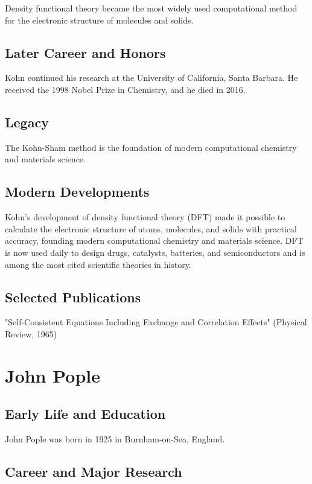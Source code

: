 Density functional theory became the most widely used computational method for the electronic structure of molecules and solids.

\subsection*{Later Career and Honors}

Kohn continued his research at the University of California, Santa Barbara. He received the 1998 Nobel Prize in Chemistry, and he died in 2016.

\subsection*{Legacy}

The Kohn-Sham method is the foundation of modern computational chemistry and materials science.

\subsection*{Modern Developments}

Kohn's development of density functional theory (DFT) made it possible to calculate the electronic structure of atoms, molecules, and solids with practical accuracy, founding modern computational chemistry and materials science. DFT is now used daily to design drugs, catalysts, batteries, and semiconductors and is among the most cited scientific theories in history.

\subsection*{Selected Publications}

"Self-Consistent Equations Including Exchange and Correlation Effects" (Physical Review, 1965)

\clearpage

\section{John Pople}

\subsection*{Early Life and Education}

John Pople was born in 1925 in Burnham-on-Sea, England.

\subsection*{Career and Major Research}


